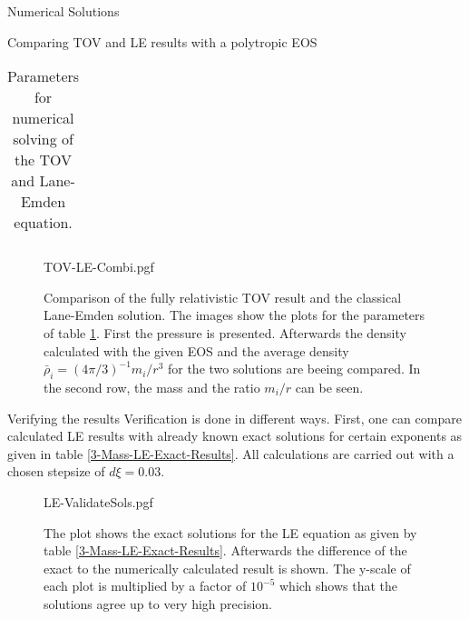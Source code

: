 \begin{section}{Numerical Solutions}
\begin{subsection}{Comparing TOV and LE results with a polytropic EOS}
\begin{table}[H]
\begin{tabular}{@{}llcll@{}}
		\bottomrule
	\end{tabular}
	\caption[Numerical Parameters for TOV and Lane-Emden equation]{Parameters for numerical solving of the TOV and Lane-Emden equation.}
	\label{4-NumSol-TOVParameters}
\end{table}%
\begin{figure}[H]
	\centering
	{TOV-LE-Combi.pgf}
	\caption[Comparison TOV and LE equation]{Comparison of the fully relativistic TOV result and the classical Lane-Emden solution. The images show the plots for the parameters of table \ref{4-NumSol-TOVParameters}. First the pressure is presented. Afterwards the density calculated with the given EOS and the average density $\bar{\rho}_i=(4\pi/3)^{-1}m_i/r^3$ for the two solutions are beeing compared. In the second row, the mass and the ratio $m_i/r$ can be seen.}
	\label{4-NumSol-TOVEqEasyEOS}
\end{figure}
\end{subsection}
%
%
\begin{subsection}{Verifying the results}
Verification is done in different ways. First, one can compare calculated LE results with already known exact  solutions for certain exponents as given in table \ref{3-Mass-LE-Exact-Results}. All calculations are carried out with a chosen stepsize of $d\xi=0.03$.
\begin{figure}[H]
	\centering
	{LE-ValidateSols.pgf}
	\caption[Validation of numerical LE results]{The plot shows the exact solutions for the LE equation as given by table \ref{3-Mass-LE-Exact-Results}. Afterwards the difference of the exact to the numerically calculated result is shown. The y-scale of each plot is multiplied by a factor of $10^{-5}$ which shows that the solutions agree up to very high precision.}
	\label{4-NumSol-ValidateLEResults}
\end{figure}


\end{subsection}
\end{section}
